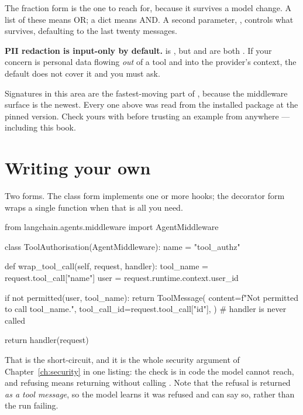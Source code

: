\medskip
\noindent
The fraction form is the one to reach for, because it survives a model change. A
list of these means OR; a dict means AND. A second parameter, ,
controls what survives, defaulting to the last twenty messages.

\textbf{PII redaction is input-only by default.}  is
, but  and  are
both . If your concern is personal data flowing \emph{out} of a tool
and into the provider's context, the default does not cover it and you must ask.

\begin{versionbox}
Signatures in this area are the fastest-moving part of , because
the middleware surface is the newest. Every one above was read from the installed
package at the pinned version. Check yours with
 before trusting an example from anywhere --- including
this book.
\end{versionbox}

\section{Writing your own}
\label{sec:custom-middleware}

Two forms. The class form implements one or more hooks; the decorator form wraps
a single function when that is all you need.

\begin{python}[caption={Authorisation, enforced in code}, label={lst:authz}]
from langchain.agents.middleware import AgentMiddleware


class ToolAuthorisation(AgentMiddleware):
    name = "tool_authz"

    def wrap_tool_call(self, request, handler):
        tool_name = request.tool_call["name"]
        user = request.runtime.context.user_id

        if not permitted(user, tool_name):
            return ToolMessage(
                content=f"Not permitted to call {tool_name}.",
                tool_call_id=request.tool_call["id"],
            )                              # handler is never called

        return handler(request)
\end{python}

That is the short-circuit, and it is the whole security argument of
Chapter~\ref{ch:security} in one listing: the check is in code the model cannot
reach, and refusing means returning without calling . Note that the
refusal is returned \emph{as a tool message}, so the model learns it was refused
and can say so, rather than the run failing.

